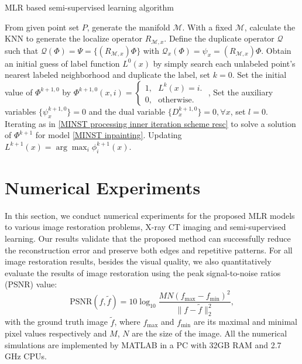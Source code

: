 \documentclass[letterpaper,10pt]{article}
\begin{document}
\begin{algorithm}

\caption{MLR based semi-supervised learning algorithm}
\label{alg:SemiSupervisedLearning}
\begin{algorithmic}


 From given point set $P$, generate the manifold $\mathcal{M}$. With a fixed $\mathcal{M}$, calculate the KNN to generate the localize operator $R_{\mathcal{M},x}$. Define the duplicate operator $\mathcal{Q}$ such that $\mathcal{Q} (\Phi) = \Psi = \{(R_{\mathcal{M},x}) \Phi\}$ with $\mathcal{Q}_x (\Phi) = \psi_x = (R_{\mathcal{M},x}) \Phi$. Obtain an initial guess of label function $L^0(x)$ by simply search each unlabeled point's nearest labeled neighborhood and duplicate the label, set $k=0$.
 Set the initial value of $\Phi^{k+1,0}$ by $\Phi^{k+1,0}(x,i) = \begin{cases}1, \ \ \ L^k(x) = i.\\0, \ \ \ \text{otherwise}. \end{cases}$ , Set the auxiliary variables $\{\psi_x^{k+1,0}\} = 0$ and the dual variable $\{D_{x}^{k+1,0}\} = 0, \forall x$, set $l=0$.
 Iterating as in \eqref{MINST processing inner iteration scheme resc} to solve a solution of $\Phi^{k+1}$ for model \eqref{MINST inpainting}.
 Updating $L^{k+1}(x)=\arg\max_i \phi^{k+1}_{i}(x)$.
\ENDWHILE


\end{algorithmic}
\end{algorithm}




\section{Numerical Experiments}
\label{sec:experiments}
In this section, we conduct numerical experiments for the proposed MLR models to various image restoration problems, X-ray CT imaging and semi-supervised learning. Our results validate that the proposed method can successfully reduce the reconstruction error and preserve both edges and repetitive patterns. For all image restoration results, besides the visual quality, we also quantitatively evaluate the results of image restoration using the peak signal-to-noise ratios (PSNR) value:
$$\mbox{PSNR}(f,\tilde{f})=10\log_{10}\frac{MN(f_{\max}-f_{\min})^2}{\|f-\tilde{f}\|_2^2},$$
with the ground truth image $\tilde{f}$, where $f_{\max}$ and $f_{\min}$ are its maximal and minimal pixel values respectively and $M$, $N$ are the size of the image.
All the numerical simulations are implemented by MATLAB in a PC with 32GB RAM and 2.7 GHz CPUs.
\end{document}

